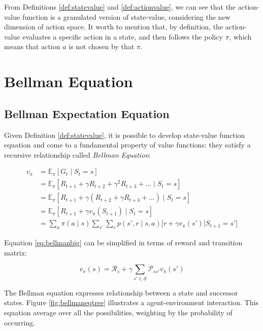 From Definitions \ref{def:statevalue} and \ref{def:actionvalue}, we can see that the action-value function is a granulated version of state-value, considering the new dimension of action space. It worth to mention that, by definition, the action-value evaluates a specific action in a state, and then follows the policy $\pi$, which means that action $a$ is not chosen by that $\pi$. 

\section{Bellman Equation}

\subsection{Bellman Expectation Equation}

Given Definition \ref{def:statevalue}, it is possible to develop state-value function equation and come to a fundamental property of value functions: they satisfy a recursive relationship called \textit{Bellman Equation}:

\begin{align}
v_{\pi} &= \mathbb{E}_{\pi}[G_{t} \mid S_{t} = s] \\
&= \mathbb{E}_{\pi}[R_{t+1} + \gamma R_{t+2} + \gamma^{2} R_{t+3} + \dots \mid S_{t} = s] \\
&= \mathbb{E}_{\pi}[R_{t+1} + \gamma (R_{t+2} + \gamma R_{t+3} + \dots) \mid S_{t} = s] \\
&= \mathbb{E}_{\pi}[R_{t+1} + \gamma v_{\pi}(S_{t+1}) \mid S_{t} = s] \\
&= \sum_{a}\pi(a \mid s) \sum_{s'}\sum_{r} p(s', r \mid s, a) \Bigg[ r + \gamma v_{\pi}(s') \Bigg| S_{t+1} = s'\Bigg]
\label{eq:bellmanbig}
\end{align}

Equation \ref{eq:bellmanbig} can be simplified in terms of reward and transition matrix:

\begin{equation}
v_{\pi}(s) = \mathcal{R}_{s} + \gamma \sum_{s' \in \mathcal{S}}\mathcal{P}_{ss'}v_{\pi}(s')
\label{eq:bellmanfinal}
\end{equation}

The Bellman equation expresses relationship between a state and successor states. Figure \ref{fig:bellmaneqtree} illustrates a agent-environment interaction. This equation average over all the possibilities, weighting by the probability of occurring.

